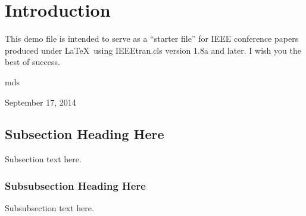 \documentclass[conference]{IEEEtran}
\begin{document}
\section{Introduction}
This demo file is intended to serve as a ``starter file''
for IEEE conference papers produced under \LaTeX\ using
IEEEtran.cls version 1.8a and later.
I wish you the best of success.

\hfill mds

\hfill September 17, 2014


\subsection{Subsection Heading Here}
Subsection text here.


\subsubsection{Subsubsection Heading Here}
Subsubsection text here.


\end{document}
